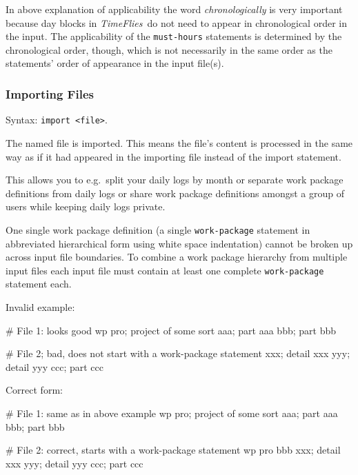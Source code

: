 \documentclass[11pt]{article}
\newcommand{\timeflies}{\emph{TimeFlies}}
\begin{document}
In above explanation of applicability the word \emph{chronologically} is very important because day blocks in \timeflies\ do not need to appear in chronological order in the input. The applicability of the \verb:must-hours: statements is determined by the chronological order, though, which is not necessarily in the same order as the statements' order of appearance in the input file(s).

\subsubsection{Importing Files}

Syntax: \verb:import <file>:.

The named file is imported. This means the file's content is processed in the same way as if it had appeared in the importing file instead of the import statement.

This allows you to e.g.\ split your daily logs by month or separate work package definitions from daily logs or share work package definitions amongst a group of users while keeping daily logs private.

One single work package definition (a single \verb:work-package: statement in abbreviated hierarchical form using white space indentation) cannot be broken up across input file boundaries. To combine a work package hierarchy from multiple input files each input file must contain at least one complete \verb:work-package: statement each.

Invalid example:

\begin{inputfile}
# File 1: looks good
wp pro; project of some sort
    aaa; part aaa
    bbb; part bbb
\end{inputfile}

\begin{inputfile}
# File 2; bad, does not start with a work-package statement
        xxx; detail xxx
        yyy; detail yyy
    ccc; part ccc
\end{inputfile}

Correct form:

\begin{inputfile}
# File 1: same as in above example
wp pro; project of some sort
    aaa; part aaa
    bbb; part bbb
\end{inputfile}

\begin{inputfile}
# File 2: correct, starts with a work-package statement
wp pro
    bbb
        xxx; detail xxx
        yyy; detail yyy
    ccc; part ccc
\end{inputfile}
\end{document}
